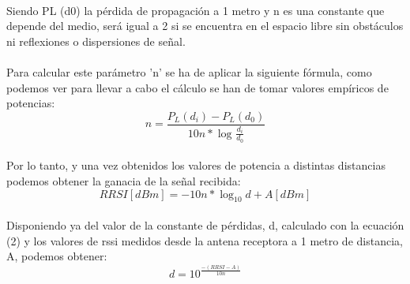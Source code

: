 \documentclass[a4paper ,12pt, onecolumn]{article}
\begin{document}
            \paragraph{}
            Siendo PL (d0)  la pérdida de propagación a 1 metro y n es una constante que depende del medio, será igual
            a 2 si se encuentra en el espacio libre sin obstáculos ni reflexiones o dispersiones de señal.
            \paragraph{}
            Para calcular este parámetro 'n' se ha de aplicar la siguiente fórmula, como podemos ver para llevar a cabo el 
            cálculo se han de tomar valores empíricos de potencias:
            \begin{equation}
                n = \frac{ P_L(d_i) - P_L(d_0) }{10n*\log_{}\frac{d_i}{d_0}}
            \end{equation}
            \paragraph{}
            Por lo tanto, y una vez obtenidos los valores de potencia a distintas distancias podemos obtener la ganacia
            de la señal recibida:
            \begin{equation}
                RRSI [dBm] = -10n*\log_{10} d+ A[dBm]
            \end{equation}
            \paragraph{}
            Disponiendo ya del valor de la constante de pérdidas, d, calculado con la ecuación (2) y los valores
            de rssi medidos desde la antena receptora a 1 metro de distancia, A, podemos obtener:
            \begin{equation}
                d= 10^\frac{-(RRSI - A) }{10n}
            \end{equation}
\end{document}
